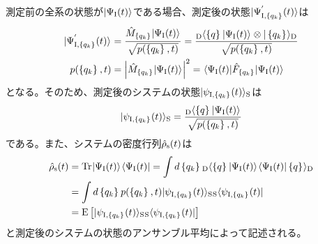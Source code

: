 \documentclass[10pt, a4paper]{jsarticle}
\begin{document}
測定前の全系の状態が$| \Psi_{\rm I}(t) \rangle_{\rm }$である場合、測定後の状態$| \Psi_{{\rm I}, \left\{ q_{k} \right\}_{}}^{'}(t) \rangle_{\rm }$は
\begin{equation}
\begin{split}
\label{eq:212}
	\ket{\Psi_{{\rm I}, \set{q_{k}}{}}^{'}(t)}{} &= \dfrac{\op{M}{\set{q_{k}}{}} \ket{\Psi_{\rm I}(t)}{}}{\sqrt{p(\set{q_{k}}{}, t)}} = \dfrac{\inner{\set{q}{}}{D}{\Psi_{\rm I}(t)}{} \otimes \ket{\set{q_{k}}{}}{D}}{\sqrt{p(\set{q_{k}}{}, t)}} \\
	p(\set{q_{k}}{}, t) &= \norm{\op{M}{\set{q_{k}}{}} \ket{\Psi_{\rm I}(t)}{}}^{2} = \bra{\Psi_{\rm I}(t)}{} \op{F}{\set{q_{k}}{}} \ket{\Psi_{\rm I}(t)}{}
\end{split}
\end{equation}
となる。そのため、測定後のシステムの状態$| \psi_{{\rm I}, \left\{ q_{k} \right\}_{}}(t) \rangle_{\rm S}$は
\begin{equation}
\begin{split}
\label{eq:213}
	\ket{\psi_{{\rm I}, \set{q_{k}}{}}(t)}{S} &= \dfrac{\inner{\set{q}{}}{D}{\Psi_{\rm I}(t)}{}}{\sqrt{p(\set{q_{k}}{}, t)}} \\
\end{split}
\end{equation}
である。また、システムの密度行列$\hat{\rho}_{\rm s}(t)$は
\begin{equation}
\begin{split}
\label{eq:214}
	\hrho{s}(t) &= \Tr{}{\ket{\Psi_{\rm I}(t)}{} \bra{\Psi_{\rm I}(t)}{}} = \int{}{} d\set{q_{k}}{} \inner{\set{q}{}}{D}{\Psi_{\rm I}(t)}{} \inner{\Psi_{\rm I}(t)}{}{\set{q}{}}{D} \\
		&= \int{}{} d\set{q_{k}}{} p(\set{q_{k}}{}, t) \ket{\psi_{{\rm I}, \set{q_{k}}{}}(t)}{S} \bra{\psi_{{\rm I}, \set{q_{k}}{}}(t)}{S} \\
		&= \ensemble{\ket{\psi_{{\rm I}, \set{q_{k}}{}}(t)}{S} \bra{\psi_{{\rm I}, \set{q_{k}}{}}(t)}{S}}
\end{split}
\end{equation}
と測定後のシステムの状態のアンサンブル平均によって記述される。
\end{document}
